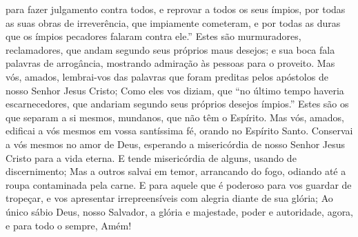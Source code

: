 {  para fazer julgamento contra todos, e reprovar a todos os seus ímpios, por todas as suas obras de irreverência, que impiamente cometeram, e por todas as duras
{} que os ímpios pecadores falaram contra ele.”
  Estes são murmuradores, reclamadores, que andam segundo seus próprios maus desejos; e sua boca fala palavras de arrogância, mostrando admiração às pessoas para o
{} proveito.
  Mas vós, amados, lembrai-vos das palavras que foram preditas pelos apóstolos de nosso Senhor Jesus Cristo;
  Como eles vos diziam, que “no último tempo haveria escarnecedores, que andariam segundo seus próprios desejos ímpios.”
  Estes são os que separam a si mesmos, mundanos, que não têm o Espírito.
  Mas vós, amados, edificai a vós mesmos em vossa santíssima fé, orando no Espírito Santo.
  Conservai a vós mesmos no amor de Deus, esperando a misericórdia de nosso Senhor Jesus Cristo para a vida eterna.
  E tende misericórdia de alguns, usando de discernimento;
  Mas a outros salvai em temor, arrancando
{} do fogo, odiando até a roupa contaminada pela carne.
  E para aquele que é poderoso para vos guardar de tropeçar, e vos apresentar irrepreensíveis com alegria diante de sua glória;
  Ao único sábio Deus, nosso Salvador,{} a glória e majestade, poder e autoridade, agora, e para todo o sempre, Amém!\par }

